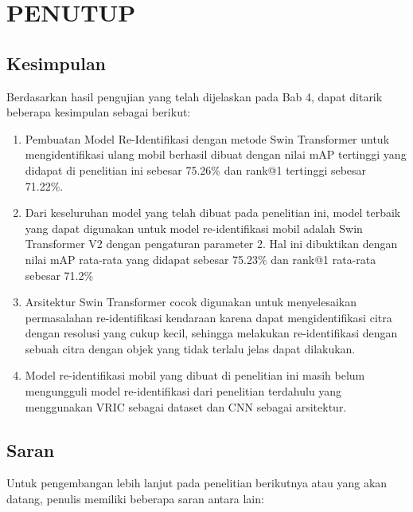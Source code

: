 \chapter{PENUTUP}
\label{chap:penutup}


\section{Kesimpulan}
\label{sec:kesimpulan}

Berdasarkan hasil pengujian yang telah dijelaskan pada Bab 4, dapat 
ditarik beberapa kesimpulan sebagai berikut:

\begin{enumerate}[nolistsep]

  \item Pembuatan Model Re-Identifikasi dengan metode Swin Transformer untuk 
  mengidentifikasi ulang mobil berhasil dibuat dengan nilai mAP tertinggi yang didapat 
  di penelitian ini sebesar 75.26\% dan rank@1 tertinggi sebesar 71.22\%.

  \item Dari keseluruhan model yang telah dibuat pada penelitian ini, 
  model terbaik yang dapat digunakan untuk model re-identifikasi mobil adalah 
  Swin Transformer V2 dengan pengaturan parameter 2. Hal ini dibuktikan dengan nilai 
  mAP rata-rata yang didapat sebesar 75.23\% dan rank@1 rata-rata sebesar 71.2\%

  \item Arsitektur Swin Transformer cocok digunakan untuk menyelesaikan permasalahan 
  re-identifikasi kendaraan karena dapat mengidentifikasi citra dengan resolusi yang cukup 
  kecil, sehingga melakukan re-identifikasi dengan sebuah citra dengan objek yang 
  tidak terlalu jelas dapat dilakukan.

  \item Model re-identifikasi mobil yang dibuat di penelitian ini masih belum mengungguli 
  model re-identifikasi dari penelitian terdahulu yang menggunakan VRIC sebagai dataset 
  dan CNN sebagai arsitektur.

\end{enumerate}

\section{Saran}
\label{chap:saran}

Untuk pengembangan lebih lanjut pada penelitian berikutnya atau yang akan datang, \linebreak
penulis memiliki beberapa saran antara lain:

